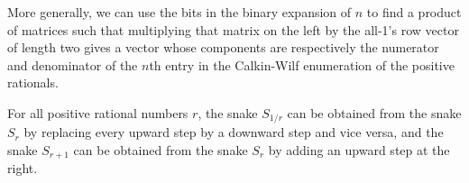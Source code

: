 \documentclass[12pt]{article}
\theoremstyle{plain}
\theoremstyle{definition}
\theoremstyle{remark}
\begin{document}
More generally, we can use the bits in the binary expansion of $n$
to find a product of matrices such that
multiplying that matrix on the left by the all-1's row vector of length two
gives a vector whose components
are respectively the numerator and denominator of
the $n$th entry in the Calkin-Wilf enumeration
of the positive rationals.

%

For all positive rational numbers $r$,
the snake $S_{1/r}$ can be obtained from the snake $S_r$
by replacing every upward step by a downward step and vice versa,
and the snake $S_{r+1}$ can be obtained from the snake $S_r$
by adding an upward step at the right.

%
\end{document}
